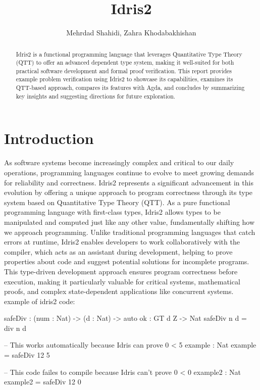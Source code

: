\documentclass[]{rptuseminar}
\title{Idris2}
\author{Mehrdad Shahidi, Zahra Khodabakhishan
  \institute{Rheinland-Pfälzische Technische Universität Kaiserslautern-Landau, Department of Computer Science}}
\begin{document}

\maketitle


\begin{abstract}
Idris2 is a functional programming language that leverages Quantitative Type Theory (QTT) to offer an advanced dependent type system, making it well-suited for both practical software development and formal proof verification.
This report provides example problem verification using Idris2 to showcase its capabilities, examines its QTT-based approach, compares its features with Agda, and concludes by summarizing key insights and suggesting directions for future exploration.

\end{abstract}


\section{Introduction}
\label{sec:introduction}
As software systems become increasingly complex and critical to our daily operations, programming languages continue to evolve to meet growing demands for reliability and correctness.
Idris2 represents a significant advancement in this evolution by offering a unique approach to program correctness through its type system based on Quantitative Type Theory (QTT).
As a pure functional programming language with first-class types, Idris2 allows types to be manipulated and computed just like any other value, fundamentally shifting how we approach programming.
Unlike traditional programming languages that catch errors at runtime, Idris2 enables developers to work collaboratively with the compiler, which acts as an assistant during development, helping to prove properties about code and suggest potential solutions for incomplete programs.
This type-driven development approach ensures program correctness before execution, making it particularly valuable for critical systems, mathematical proofs, and complex state-dependent applications like concurrent systems\cite{BradyYoutube2023}.
\\example of idris2 code:
\begin{idris}
	safeDiv : (num : Nat) -> (d : Nat) -> {auto ok : GT d Z} -> Nat  
	safeDiv n d  = div n d  

	-- This works automatically because Idris can prove 0 < 5  
	example : Nat  
	example = safeDiv 12 5

	-- This code failes to compile because Idris can't prove 0 < 0
	example2 : Nat
	example2 = safeDiv 12 0


\end{idris}
\end{document}
